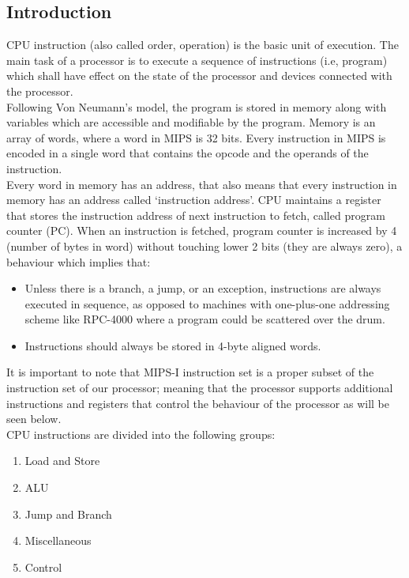 \documentclass[]{scrartcl}
\begin{document}
\subsection{Introduction}

CPU instruction (also called order, operation) is the basic unit
of execution. The main task of a processor is to execute a sequence
of instructions (i.e, program) which shall have effect on the state
of the processor and devices connected with the processor.\\

Following Von Neumann's model, the program is stored in memory along
with variables which are accessible and modifiable by the program.
Memory is an array of words, where a word in MIPS is 32 bits. Every
instruction in MIPS is encoded in a single word that contains
the opcode and the operands of the instruction.\\

Every word in memory has an address, that also means that every
instruction in memory has an address called `instruction address'.
CPU maintains a register that stores the instruction address of
next instruction to fetch, called program counter (PC). When an
instruction is fetched, program counter is increased by 4 (number
of bytes in word) without touching lower 2 bits (they are
always zero), a behaviour which implies that:

\begin{itemize}

\item Unless there is a branch, a jump, or an exception, instructions
      are always executed in sequence, as opposed to machines with
      one-plus-one addressing scheme like RPC-4000 where a program
      could be scattered over the drum.

\item Instructions should always be stored in 4-byte aligned words.

\end{itemize}

It is important to note that MIPS-I instruction set is a proper
subset of the instruction set of our processor; meaning that
the processor supports additional instructions and registers that 
control the behaviour of the processor as will be seen below.\\

CPU instructions are divided into the following groups:

\begin{enumerate}

\item Load and Store
\item ALU
\item Jump and Branch
\item Miscellaneous
\item Control

\end{enumerate}
\end{document}
